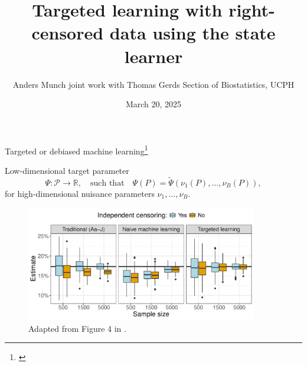 \documentclass[smaller]{beamer}\usepackage{listings}
\author{Anders Munch \newline \small joint work with Thomas Gerds \newline \newline Section of Biostatistics, UCPH}
\date{March 20, 2025}
\title{Targeted learning with right-censored data using the state learner}
\newcommand{\R}{\mathbb{R}}
\newcommand{\1}{\mathds{1}}
\begin{document}
\maketitle

\begin{frame}[label={sec:org040975f}]{Targeted or debiased machine learning\footnote{\citep{van2011targeted,chernozhukov2018double}}}
\vspace{.3cm}

Low-dimensional target parameter
\begin{equation*}
  \Psi \colon \mathcal{P}
  \rightarrow \R,
  \quad \text{such that} \quad
  \Psi(P) =
  \tilde{\Psi}(\nu_1(P), \dots , \nu_B(P)),
\end{equation*}
for high-dimensional nuisance parameters \(\nu_1, \dots,
\nu_B\).

\vfill
\pause

\begin{figure}[htbp]
\centering
\includegraphics[width=0.9\textwidth]{./targeted-learning-illu.pdf}
\caption{Adapted from Figure 4 in \citep{munch2023targeted}.}
\end{figure}
\end{frame}
\end{document}

